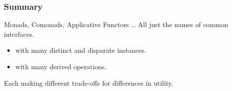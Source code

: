 \begin{frame}
\frametitle{Summary}
\begin{block}{Monads, Comonads, Applicative Functors \ldots}
All just the names of common interfaces.
\begin{itemize}
\item with many distinct and disparate instances.
\item with many derived operations.
\end{itemize}
Each making different trade-offs for differences in utility.
\end{block}
\end{frame}

